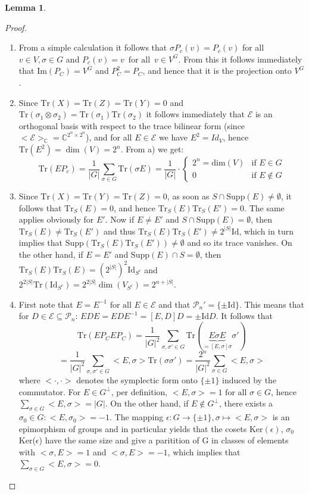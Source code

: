 \documentclass{article}
\def\P{\mathcal{P}}
\def\C{\mathbb{C}}
\def\supp{\text{Supp}}
\def\fa{\text{ for all }}
\def\Tr{\text{Tr}}
\def\Id{\text{Id}}
\newenvironment{bew}{\begin{proof}[Proof]}{\end{proof}}
\theoremstyle{definition}
\newtheorem{lem}[Satz]{Lemma}
\begin{document}
\begin{lem}
\begin{bew}
\begin{enumerate}
\item From a simple calculation it follows that $\sigma P_c(v) = P_c(v)$ for all $v \in V, \sigma \in G$ and $P_c(v) = v \, \fa \, v \in V^G$. From this it follows immediately that Im$(P_C) = V^G$ and $P_C^2 = P_C$, and hence that it is the projection onto $V^G$.
\item Since $\Tr(X) = \Tr(Z) = \Tr(Y) = 0$ and $\Tr(\sigma_1 \otimes \sigma_2) = \Tr(\sigma_1)\Tr(\sigma_2)$ it follows immediately that $\mathcal{E}$ is an orthogonal basis with respect to the trace bilinear form (since $<\mathcal{E}>_\C = \C^{2^n \times 2^n}$), and for all $E \in \mathcal{E}$ we have $E^2 = Id_V$, hence $\Tr(E^2) = \dim(V) = 2^n$.
From a) we get: \begin{equation} \Tr( E P_c) = \frac{1}{|G|} \sum_{\sigma \in G} \Tr(\sigma E) = \frac{1}{|G|} \cdot \left\{ \begin{array}{lr} 2^n = \text{dim}(V) & \text{if } E \in G \\ 0 & \text{if } E \notin G \end{array} \right. \end{equation}
\item Since $\Tr(X) = \Tr(Y) = \Tr(Z) = 0$, as soon as $S \cap \supp(E) \neq \emptyset$, it follows that $\Tr_S(E) = 0$, and hence $\Tr_S(E)\Tr_S(E') = 0$. The same applies obviously for $E'$. Now if $E \neq E'$ and $S \cap \supp(E) = \emptyset$, then $\Tr_S(E) \neq \Tr_S(E')$ and thus $\Tr_S(E)\Tr_S(E') \neq 2^{|S|} \Id $, which in turn implies that $\supp(\Tr_S(E)\Tr_S(E')) \neq \emptyset$ and so its trace vanishes.
On the other hand, if $E = E'$ and $\supp(E) \cap S = \emptyset$, then $\Tr_S(E)\Tr_S(E) = (2^{|S|})^2 \Id_{S^c}$ and $2^{2|S|} \Tr(\Id_{S^c}) = 2^{2|S|} \dim(V_{S^c}) = 2^{n + |S|}$.
\item First note that $E = E^{-1} \fa E \in \mathcal{E}$ and that $\P_n' = \{\pm \Id \}$. This means that for $D \in \mathcal{E} \subseteq \P_n $: $EDE = EDE^{-1} = [E,D]D = \pm \Id D$. It follows that
\begin{equation} \Tr(E P_C E P_C) = \frac{1}{|G|^2} \sum_{\sigma, \sigma' \in G} \Tr( \underbrace{E \sigma E}_{ = [E,\sigma]\sigma} \sigma') \end{equation}
\begin{equation} = \frac{1}{|G|^2} \sum_{\sigma, \sigma' \in G} <E,\sigma> \Tr( \sigma \sigma') =  \frac{2^n}{|G|^2} \sum_{\sigma \in G} <E,\sigma> \end{equation} where $< \cdot, \cdot >$ denotes the symplectic form onto $\{ \pm 1 \}$ induced by the commutator.
For $E \in G^\perp$, per definition, $<E,\sigma> = 1 \fa \sigma \in G$, hence $\sum_{\sigma \in G} <E,\sigma> = |G|$. On the other hand, if $E \notin G^\perp$, there exists a $\sigma_0 \in G: <E, \sigma_0> = -1$. The mapping $\epsilon: G \rightarrow \{ \pm 1 \}, \sigma \mapsto <E,\sigma>$ is an epimorphism of groups and 
in particular yields that the cosets Ker$(\epsilon)$, $\sigma_0$ Ker($\epsilon$) have the same size and give a paritition of G in classes of elements with $<\sigma,E> = 1$ and $<\sigma,E> = -1$, which implies that $\sum_{\sigma \in G} <E,\sigma> = 0$.


\end{enumerate}
\end{bew}
\end{lem}
\end{document}
